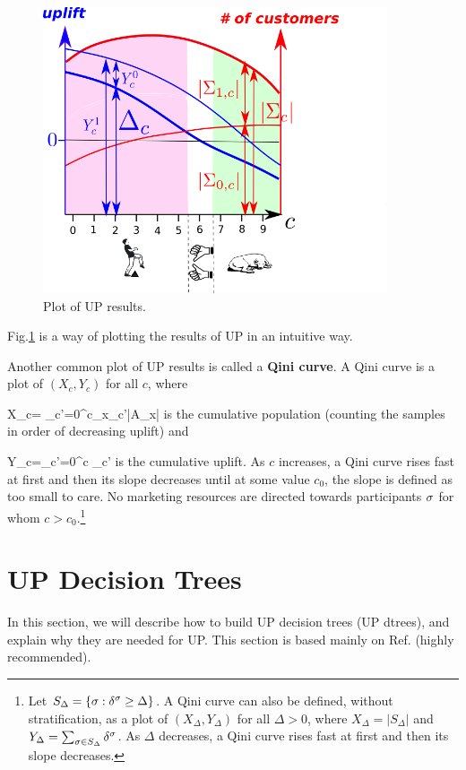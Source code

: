 \begin{figure}[h!]
\centering
\includegraphics[width=4in]
{uplift/qini-fake.png}

\caption{
Plot
of UP results.
} 
\label{fig-qini-fake}
\end{figure}
Fig.\ref{fig-qini-fake}
is a  way of
plotting
the results 
of UP in an
intuitive
way.


Another common plot of UP results is
called a {\bf Qini
curve}.
A Qini curve is a plot 
of $(X_c,Y_c)$
for all $c$, where

\beq
X_c= \sum_{c'=0}^{c}\sum_{x\in \calx_{c'}}|A_x|
\eeq
is the cumulative population (counting the
samples in
order of decreasing uplift) and

\beq
Y_c=\sum_{c'=0}^c \Delta_{c'}
\eeq
is the cumulative uplift.
As $c$ increases, a Qini curve rises fast at first and then its slope decreases until
at some value $c_0$, the slope is defined as too small to care. No marketing resources are
directed towards
participants $\sigma$ for whom  $c>c_0$.\footnote{
Let 
$S_{\Delta} = \{\sigma:\delta^\sigma \geq \Delta\}$.
A Qini curve can also be defined, without stratification,
as a
 plot of $(X_\Delta, Y_\Delta)$ for all $\Delta>0$,
where $
X_\Delta = |S_{\Delta}|$
and
$
Y_\Delta= \sum_{\sigma\in S_{\Delta}}\delta^\sigma
$. As $\Delta$ decreases, a Qini curve rises fast at first and then its slope decreases.
}




\section{UP Decision Trees}

In this section,
we will describe
how to build UP decision trees (UP dtrees),
and explain why they are needed
for UP. This section is based 
mainly on Ref.\cite{jaros} (highly recommended).

